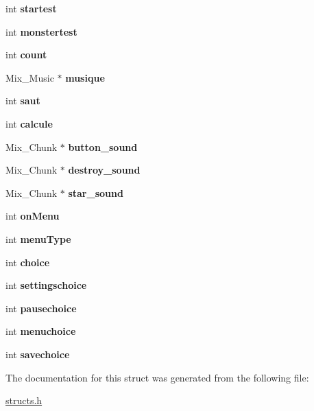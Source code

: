 \begin{DoxyCompactItemize}
int {\bfseries startest}
\item 
\mbox{\label{structGestion_a43fe7627f38a9ae555448abefad86308}} 
int {\bfseries monstertest}
\item 
\mbox{\label{structGestion_a56eb34671e2c251d2ec33e6da6f5f0e0}} 
int {\bfseries count}
\item 
\mbox{\label{structGestion_ab486b4c437e9b6fe9c159c25a19dd68e}} 
Mix\+\_\+\+Music $\ast$ {\bfseries musique}
\item 
\mbox{\label{structGestion_aedb70bd79a3c44738e3fd82146de849e}} 
int {\bfseries saut}
\item 
\mbox{\label{structGestion_a2ee48d4a5c5e1c485b3245c401d2ac81}} 
int {\bfseries calcule}
\item 
\mbox{\label{structGestion_acf7f6c0972aa925de58092ad44d18164}} 
Mix\+\_\+\+Chunk $\ast$ {\bfseries button\+\_\+sound}
\item 
\mbox{\label{structGestion_a805f36a28e3fd6d1309b39f2282b62bc}} 
Mix\+\_\+\+Chunk $\ast$ {\bfseries destroy\+\_\+sound}
\item 
\mbox{\label{structGestion_a97cf0065445f62fa8813a0e8bf2d3fef}} 
Mix\+\_\+\+Chunk $\ast$ {\bfseries star\+\_\+sound}
\item 
\mbox{\label{structGestion_adf978777a1bb62cd649a8823833ef92b}} 
int {\bfseries on\+Menu}
\item 
\mbox{\label{structGestion_ae265ab8773b528f9521a0e050651cee7}} 
int {\bfseries menu\+Type}
\item 
\mbox{\label{structGestion_a06ff0b6b13b4c8a63e5339ef793f2fc9}} 
int {\bfseries choice}
\item 
\mbox{\label{structGestion_a7dd3e9cc5937219ebcaadfd18d93ee01}} 
int {\bfseries settingschoice}
\item 
\mbox{\label{structGestion_a0d1bbc9f1719750c9748ff1d4d615c38}} 
int {\bfseries pausechoice}
\item 
\mbox{\label{structGestion_a98bf35b98b1723052ae7bd9f28bfd060}} 
int {\bfseries menuchoice}
\item 
\mbox{\label{structGestion_aedfd98a98fda3f8a71350c0b8ffe4047}} 
int {\bfseries savechoice}
\end{DoxyCompactItemize}


The documentation for this struct was generated from the following file\+:\begin{DoxyCompactItemize}
\item 
\hyperlink{structs_8h}{structs.\+h}\end{DoxyCompactItemize}
